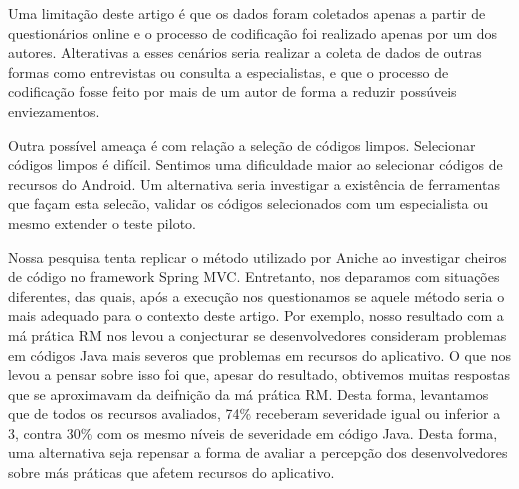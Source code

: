Uma limitação deste artigo é que os dados foram coletados apenas a partir de questionários online e o processo de codificação foi realizado apenas por um dos autores. Alterativas a esses cenários seria realizar a coleta de dados de outras formas como entrevistas ou consulta a especialistas, e que o processo de codificação fosse feito por mais de um autor de forma a reduzir possúveis enviezamentos.

Outra possível ameaça é com relação a seleção de códigos limpos. Selecionar códigos limpos é difícil. Sentimos uma dificuldade maior ao selecionar códigos de recursos do Android. Um alternativa seria investigar a existência de ferramentas que façam esta selecão, validar os códigos selecionados com um especialista ou mesmo extender o teste piloto. 

Nossa pesquisa tenta replicar o método utilizado por Aniche \cite{FinavaroAniche2016} ao investigar cheiros de código no framework Spring MVC. Entretanto, nos deparamos com situações diferentes, das quais, após a execução nos questionamos se aquele método seria o mais adequado para o contexto deste artigo. Por exemplo, nosso resultado com a má prática RM nos levou a conjecturar se desenvolvedores consideram problemas em códigos Java mais severos que problemas em recursos do aplicativo. O que nos levou a pensar sobre isso foi que, apesar do resultado, obtivemos muitas respostas que se aproximavam da deifnição da má prática RM. Desta forma, levantamos que de todos os recursos avaliados, 74\% receberam severidade igual ou inferior a 3, contra 30\% com os mesmo níveis de severidade em código Java. Desta forma, uma alternativa seja repensar a forma de avaliar a percepção dos desenvolvedores sobre más práticas que afetem recursos do aplicativo.
